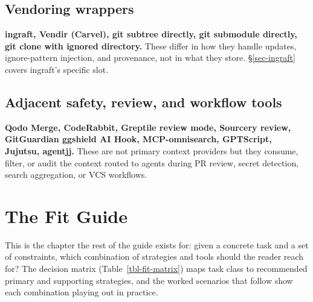 \documentclass[
  11pt,
  letterpaper,
  numbers=noendperiod,
  parskip=half]{scrartcl}
\begin{document}
\subsection{Vendoring wrappers}\label{sec-tools-vendor}

\textbf{ingraft, Vendir (Carvel), git subtree directly, git submodule
directly, git clone with ignored directory.} These differ in how they
handle updates, ignore-pattern injection, and provenance, not in what
they store. \S\ref{sec-ingraft} covers ingraft's specific slot.

\subsection{Adjacent safety, review, and workflow tools}\label{sec-tools-adjacent}

\textbf{Qodo Merge, CodeRabbit, Greptile review mode, Sourcery review,
GitGuardian ggshield AI Hook, MCP-omnisearch, GPTScript, Jujutsu,
agentjj.} These are not primary context providers but they consume,
filter, or audit the context routed to agents during PR review,
secret detection, search aggregation, or VCS workflows.

\section{The Fit Guide}\label{sec-fit}

This is the chapter the rest of the guide exists for: given a concrete
task and a set of constraints, which combination of strategies and
tools should the reader reach for? The decision matrix
(Table~\ref{tbl-fit-matrix}) maps task class to recommended primary and
supporting strategies, and the worked scenarios that follow show each
combination playing out in practice.
\end{document}
